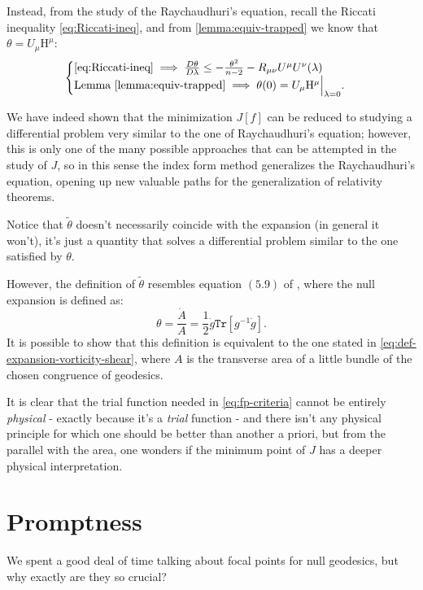 	Instead, from the study of the Raychaudhuri's equation, recall the Riccati inequality \eqref{eq:Riccati-ineq}, and from \ref{lemma:equiv-trapped} we know that \(\theta = U_{\mu}\mathrm{H}^{\mu}\):
	\[
	\begin{cases}
	\eqref{eq:Riccati-ineq} \implies \frac{D\theta}{D\lambda} \le -\frac{\theta^2}{n - 2} - R_{\mu\nu}U^{\mu}U^{\nu}(\lambda) \\
	\text{Lemma }\ref{lemma:equiv-trapped} \implies \theta(0) = U_{\mu}\mathrm{H}^{\mu}\Big\vert_{\lambda = 0}.
	\end{cases}	
	\]
	
	We have indeed shown that the minimization \(J[f]\) can be reduced to studying a differential problem very similar to the one of Raychaudhuri's equation; however, this is only one of the many possible approaches that can be attempted in the study of \(J\), so in this sense the index form method generalizes the Raychaudhuri's equation, opening up new valuable paths for the generalization of relativity theorems.

	\begin{remark}
		Notice that \(\tilde{\theta}\) doesn't necessarily coincide with the expansion (in general it won't), it's just a quantity that solves a differential problem similar to the one satisfied by \(\theta\). 
		
		However, the definition of \(\tilde{\theta}\) resembles equation \((5.9)\) of \cite{witten2020light}, where the null expansion is defined as:
		\[
		\theta = \frac{\dot{A}}{A} = \frac{1}{2}\dot{g}\texttt{Tr}\left[g^{-1}\dot{g}\right].
		\]
		It is possible to show that this definition is equivalent to the one stated in \eqref{eq:def-expansion-vorticity-shear}, where \(A\) is the transverse area of a little bundle of the chosen congruence of geodesics.
		
		It is clear that the trial function needed in \ref{eq:fp-criteria} cannot be entirely \emph{physical} - exactly because it's a \emph{trial} function - and there isn't any physical principle for which one should be better than another a priori, but from the parallel with the area, one wonders if the minimum point of \(J\) has a deeper physical interpretation.
	\end{remark}

\section{Promptness}
\label{sec:promptness}

We spent a good deal of time talking about focal points for null geodesics, but why exactly are they so crucial?

